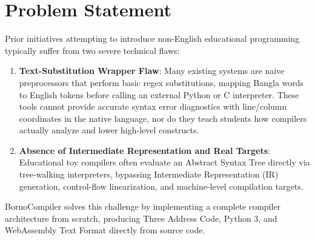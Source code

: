 \documentclass[12pt, a4paper]{report}
\begin{document}
\section{Problem Statement}
Prior initiatives attempting to introduce non-English educational programming typically suffer from two severe technical flaws:
\begin{enumerate}
    \item \textbf{Text-Substitution Wrapper Flaw}: Many existing systems are naive preprocessors that perform basic regex substitutions, mapping Bangla words to English tokens before calling an external Python or C interpreter. These tools cannot provide accurate syntax error diagnostics with line/column coordinates in the native language, nor do they teach students how compilers actually analyze and lower high-level constructs.
    \item \textbf{Absence of Intermediate Representation and Real Targets}: Educational toy compilers often evaluate an Abstract Syntax Tree directly via tree-walking interpreters, bypassing Intermediate Representation (IR) generation, control-flow linearization, and machine-level compilation targets.
\end{enumerate}
BornoCompiler solves this challenge by implementing a complete compiler architecture from scratch, producing Three Address Code, Python 3, and WebAssembly Text Format directly from source code.
\end{document}
